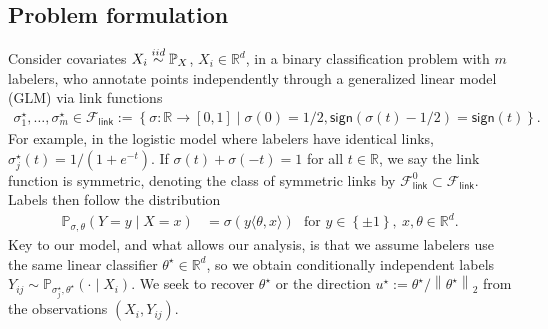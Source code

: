 \documentclass[11pt]{article}
\newcommand{\Prb}{\mathbb{P}}
\newcommand{\R}{\mathbb{R}} %
\renewcommand{\P}{\mathbb{P}}
\newcommand{\brc}[1]{\left\{{#1}\right\}}
\newcommand{\prn}[1]{\left({#1}\right)} %
\newcommand{\norm}[1]{\left\|{#1}\right\|} %
\newcommand{\sgn}{\mathsf{sign}}
\newcommand{\flink}{\mathcal{F}_{\mathsf{link}}}
\newcommand{\fsymlink}{\mathcal{F}_{\mathsf{link}}^0}
\newcommand{\ltwo}[1]{\norm{#1}_2} %
\newcommand{\<}{\langle} %
\renewcommand{\>}{\rangle}
\newcommand{\simiid}{\stackrel{\textup{iid}}{\sim}}
\newcommand{\opt}{^\star}
\begin{document}
\subsection{Problem formulation}
\label{sec:formulation}


Consider covariates $X_i \simiid \P_X$, $X_i \in \R^d$, in a
binary classification problem with $m$ labelers,
who annotate points independently through a generalized linear
model (GLM) via link functions %
\begin{align*}
  \sigma_1\opt, \dots,
  \sigma_m\opt \in \flink := \brc{\sigma : \R \to [0, 1]
    \mid \sigma(0) = 1/2, \sgn(\sigma(t) - 1/2) = \sgn(t)}.
\end{align*} 
For example, in the logistic model where
labelers have identical links, $\sigma_j\opt(t) = 1 / \prn{1 + e^{-t}}$.
%
If $\sigma(t) + \sigma(-t) = 1$ for all $t \in \mathbb{R}$, we say the
link function is symmetric, denoting the class of symmetric
links by $\fsymlink \subset \flink$.
%
Labels then follow the distribution
\begin{align}
  \Prb_{\sigma, \theta}(Y = y \mid X = x) & =
  \sigma ( y \< \theta, x\>) ~~~ \mbox{for~} y \in \left\{\pm 1\right\},
  ~ x,\theta \in \R^d. \label{eq:general-calibration-model}
\end{align}
Key to our model, and what allows our analysis, is that we assume
labelers use the same linear classifier $\theta\opt \in \R^d$, %
so we obtain conditionally independent labels $Y_{ij} \sim \Prb_{\sigma_j\opt,
  \theta\opt}(\cdot \mid X_i)$.
 We
seek to recover $\theta\opt$ or the direction $u\opt := \theta\opt /
\ltwo{\theta\opt}$ from the observations $(X_i, Y_{ij})$.
\end{document}
